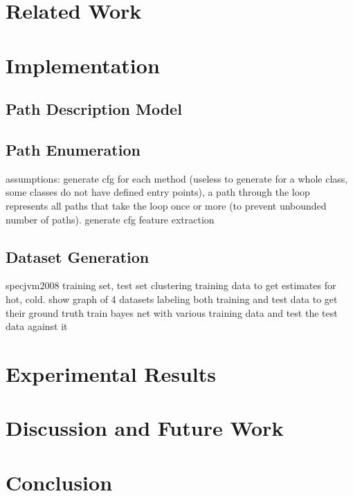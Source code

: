 \documentclass[10pt,twocolumn,letterpaper]{article}
\begin{document}
\section{Related Work}
\label{sec:bg}

\section{Implementation}
\label{sec:implementation}

\subsection{Path Description Model}
\subsection{Path Enumeration}
assumptions: generate cfg for each method (useless to generate for a whole class, some classes do not have defined entry points), a path through the loop
represents all paths that take the loop once or more (to prevent unbounded number of paths).
generate cfg
feature extraction
\subsection{Dataset Generation}
specjvm2008
training set, test set
clustering training data to get estimates for hot, cold. show graph of 4 datasets
labeling both training and test data to get their ground truth
train bayes net with various training data and test the test data against it


\section{Experimental Results}
\label{sec:results}

\section{Discussion and Future Work}
\label{sec:difficulties}

\section{Conclusion}
\label{sec:conc}

\end{document}
